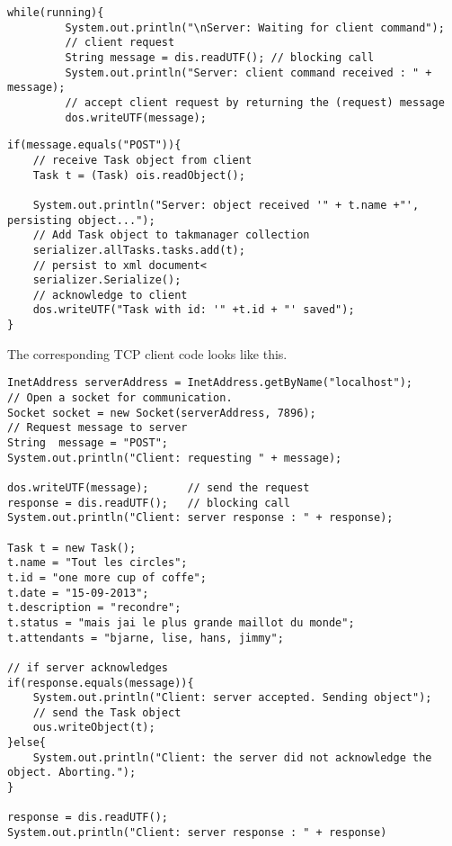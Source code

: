 \begin{lstlisting}[caption= servers initial request-response]
while(running){
         System.out.println("\nServer: Waiting for client command");
         // client request
         String message = dis.readUTF(); // blocking call
         System.out.println("Server: client command received : " + message);
         // accept client request by returning the (request) message
         dos.writeUTF(message);    

\end{lstlisting}

\begin{lstlisting}[caption= server POST method]
if(message.equals("POST")){
    // receive Task object from client
   	Task t = (Task) ois.readObject();
   	
   	System.out.println("Server: object received '" + t.name +"', persisting object...");
   	// Add Task object to takmanager collection
   	serializer.allTasks.tasks.add(t);
   	// persist to xml document<
   	serializer.Serialize();
   	// acknowledge to client   	
   	dos.writeUTF("Task with id: '" +t.id + "' saved");
}

\end{lstlisting}


The corresponding TCP client code looks like this.
%


\begin{lstlisting}
InetAddress serverAddress = InetAddress.getByName("localhost");            
// Open a socket for communication.
Socket socket = new Socket(serverAddress, 7896);
// Request message to server
String  message = "POST";			
System.out.println("Client: requesting " + message);

dos.writeUTF(message);		// send the request
response = dis.readUTF();	// blocking call          
System.out.println("Client: server response : " + response);         

Task t = new Task();
t.name = "Tout les circles";
t.id = "one more cup of coffe";
t.date = "15-09-2013";	
t.description = "recondre";
t.status = "mais jai le plus grande maillot du monde";
t.attendants = "bjarne, lise, hans, jimmy";

// if server acknowledges
if(response.equals(message)){
   	System.out.println("Client: server accepted. Sending object");
   	// send the Task object
   	ous.writeObject(t);
}else{
   	System.out.println("Client: the server did not acknowledge the object. Aborting.");
}

response = dis.readUTF();
System.out.println("Client: server response : " + response)
\end{lstlisting}



